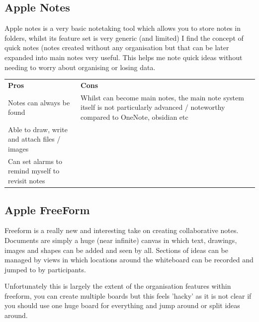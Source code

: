 \subsection*{Apple Notes}
Apple notes is a very basic notetaking tool which allows you to store notes in folders, whilst its feature set is very generic (and limited) I find the concept of quick notes (notes created without any organisation but that can be later expanded into main notes very useful. This helps me note quick ideas without needing to worry about organising or losing data.

\begin{tabularx}{\textwidth}{>{\raggedright\arraybackslash}X>{\raggedright\arraybackslash}X}
    \rowcolor{gray!15} \textbf{Pros} & \textbf{Cons}                                                             \\ Notes can always be found  &  Whilst can become main notes, the main note system itself is not particularly advanced / noteworthy compared to OneNote, obsidian etc\\
    Able to draw, write and attach files / images             &                                  \\
            Can set alarms to remind myself to revisit notes                         &                        \\
                                    
\end{tabularx}

\subsection*{Apple FreeForm}
Freeform is a really new and interesting take on creating collaborative notes. Documents are simply a huge (near infinite) canvas in which text, drawings, images and shapes can be added and seen by all. Sections of ideas can be managed by views in which locations around the whiteboard can be recorded and jumped to by participants.

Unfortunately this is largely the extent of the organisation features within freeform, you can create multiple boards but this feels 'hacky' as it is not clear if you should use one huge board for everything and jump around or split ideas around.

